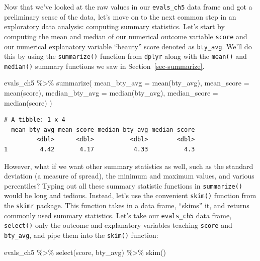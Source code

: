 \documentclass[
  letterpaper,
  DIV=11,
  numbers=noendperiod]{scrreprt}
\newenvironment{Shaded}{\begin{snugshade}}{\end{snugshade}}
\newcommand{\AttributeTok}[1]{\textcolor[rgb]{0.40,0.45,0.13}{#1}}
\newcommand{\FunctionTok}[1]{\textcolor[rgb]{0.28,0.35,0.67}{#1}}
\newcommand{\NormalTok}[1]{\textcolor[rgb]{0.00,0.23,0.31}{#1}}
\newcommand{\SpecialCharTok}[1]{\textcolor[rgb]{0.37,0.37,0.37}{#1}}
\theoremstyle{definition}
\theoremstyle{remark}
\begin{document}
Now that we've looked at the raw values in our \texttt{evals\_ch5} data
frame and got a preliminary sense of the data, let's move on to the next
common step in an exploratory data analysis: computing summary
statistics. Let's start by computing the mean and median of our
numerical outcome variable \texttt{score} and our numerical explanatory
variable ``beauty'' score denoted as \texttt{bty\_avg}. We'll do this by
using the \texttt{summarize()} function from \texttt{dplyr} along with
the \texttt{mean()} and \texttt{median()} summary functions we saw in
Section~\ref{sec-summarize}.

\begin{Shaded}
\begin{Highlighting}[]
\NormalTok{evals\_ch5 }\SpecialCharTok{\%\textgreater{}\%}
  \FunctionTok{summarize}\NormalTok{(}
    \AttributeTok{mean\_bty\_avg =} \FunctionTok{mean}\NormalTok{(bty\_avg),}
    \AttributeTok{mean\_score =} \FunctionTok{mean}\NormalTok{(score),}
    \AttributeTok{median\_bty\_avg =} \FunctionTok{median}\NormalTok{(bty\_avg), }
    \AttributeTok{median\_score =} \FunctionTok{median}\NormalTok{(score)}
\NormalTok{    )}
\end{Highlighting}
\end{Shaded}

\begin{verbatim}
# A tibble: 1 x 4
  mean_bty_avg mean_score median_bty_avg median_score
         <dbl>      <dbl>          <dbl>        <dbl>
1         4.42       4.17           4.33          4.3
\end{verbatim}

However, what if we want other summary statistics as well, such as the
standard deviation (a measure of spread), the minimum and maximum
values, and various percentiles? Typing out all these summary statistic
functions in \texttt{summarize()} would be long and tedious. Instead,
let's use the convenient \texttt{skim()} function from the
\texttt{skimr} package. This function takes in a data frame, ``skims''
it, and returns commonly used summary statistics. Let's take our
\texttt{evals\_ch5} data frame, \texttt{select()} only the outcome and
explanatory variables teaching \texttt{score} and \texttt{bty\_avg}, and
pipe them into the \texttt{skim()} function:

\begin{Shaded}
\begin{Highlighting}[]
\NormalTok{evals\_ch5 }\SpecialCharTok{\%\textgreater{}\%}
  \FunctionTok{select}\NormalTok{(score, bty\_avg) }\SpecialCharTok{\%\textgreater{}\%}
  \FunctionTok{skim}\NormalTok{()}
\end{Highlighting}
\end{Shaded}
\end{document}
